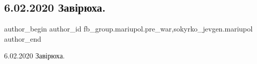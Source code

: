  
 
 
 
 

\subsection{6.02.2020 Завірюха.}
\label{sec:06_02_2023.fb.fb_group.mariupol.pre_war.1.6_02_2020_zav_ryukha}
 
\ifcmt
 author_begin
   author_id fb_group.mariupol.pre_war,sokyrko_jevgen.mariupol
 author_end
\fi

6.02.2020 Завірюха.

